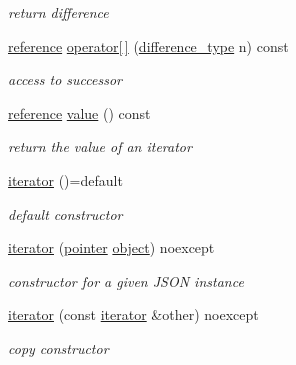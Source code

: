 \begin{DoxyCompactItemize}
\begin{DoxyCompactList}\small\item\em return difference \end{DoxyCompactList}\item 
\hyperlink{classnlohmann_1_1basic__json_1_1const__iterator_aefd248cac6493eed1e6ff53ba6a63eb2}{reference} \hyperlink{classnlohmann_1_1basic__json_1_1iterator_a7e01532727c10f87926dac4eb8e170f4}{operator\mbox{[}$\,$\mbox{]}} (\hyperlink{classnlohmann_1_1basic__json_1_1const__iterator_a49d7c3e9ef3280df03052cce988b792f}{difference\-\_\-type} n) const 
\begin{DoxyCompactList}\small\item\em access to successor \end{DoxyCompactList}\item 
\hyperlink{classnlohmann_1_1basic__json_1_1const__iterator_aefd248cac6493eed1e6ff53ba6a63eb2}{reference} \hyperlink{classnlohmann_1_1basic__json_1_1iterator_a8ffbf287736048e683f58306fdb8701f}{value} () const 
\begin{DoxyCompactList}\small\item\em return the value of an iterator \end{DoxyCompactList}\item 
\hyperlink{classnlohmann_1_1basic__json_1_1iterator_a47fb2dbbbfaf65c0ccfa99aeaed920a1}{iterator} ()=default
\begin{DoxyCompactList}\small\item\em default constructor \end{DoxyCompactList}\item 
\hyperlink{classnlohmann_1_1basic__json_1_1iterator_a085fe0d8cf459b5b1ae7b518b933ae7d}{iterator} (\hyperlink{classnlohmann_1_1basic__json_1_1const__iterator_a1da96fc3054d547e7706d3a2f073f389}{pointer} \hyperlink{classnlohmann_1_1basic__json_ad25b2f8c21e241e2d63455537a9294ff}{object}) noexcept
\begin{DoxyCompactList}\small\item\em constructor for a given J\-S\-O\-N instance \end{DoxyCompactList}\item 
\hyperlink{classnlohmann_1_1basic__json_1_1iterator_a1de0975e812c83e74d118b3e1063f335}{iterator} (const \hyperlink{classnlohmann_1_1basic__json_1_1iterator}{iterator} \&other) noexcept
\begin{DoxyCompactList}\small\item\em copy constructor \end{DoxyCompactList}\item 

\end{DoxyCompactItemize}

